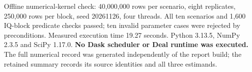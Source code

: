 Offline numerical-kernel check: 40,000,000 rows per scenario,
eight replicates, 250,000 rows per block, seed 20261126, four threads.
All ten scenarios and 1,600 IQ-block predicate checks passed; ten invalid
parameter cases were rejected by preconditions. Measured execution time
19.27 seconds. Python 3.13.5, NumPy 2.3.5 and SciPy 1.17.0.
\textbf{No Dask scheduler or Deal runtime was executed.}
The full numerical record was generated independently of the report build;
the retained summary records its source identities and all three estimands.
